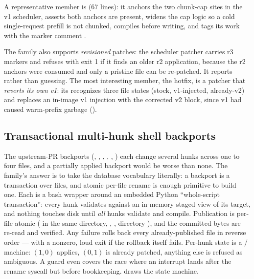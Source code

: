 A representative member is
 (67 lines): it
anchors the two chunk-cap sites in the v1 scheduler, asserts both anchors are
present, widens the cap logic so a cold single-request prefill is not chunked,
compiles before writing, and tags its work with the marker comment
.

The family also supports \emph{revisioned}
patches: the  scheduler patcher carries r3 markers and
refuses with exit 1 if it finds an older r2 application, because the r2
anchors were consumed and only a pristine file can be re-patched. It reports
 rather than guessing. The most interesting member,
the  hotfix, is a patcher that \emph{reverts its own v1}:
its  recognizes three file states (stock, v1-injected,
already-v2) and replaces an in-image v1 injection with the corrected v2
block, since v1 had caused warm-prefix garbage ().

\subsection{Transactional multi-hunk shell backports}

The upstream-PR backports (, , ,
, , ) each change several hunks
across one to four files, and a partially applied backport would be worse than
none. The family's answer is to take the database vocabulary literally: a
backport is a transaction over files, and atomic per-file rename is enough
primitive to build one. Each is a bash wrapper around an embedded Python ``whole-script
transaction'': every hunk validates against an in-memory staged view of its
target, and nothing touches disk until \emph{all} hunks validate and compile.
Publication is per-file atomic ( in the same directory,
, , directory ), and the committed
bytes are re-read and verified. Any failure rolls back every
already-published file in reverse order --- with a nonzero, loud exit if the
rollback itself fails. Per-hunk state is a
/ machine: $(1,0)$ applies, $(0,1)$ is
already patched, anything else is refused as ambiguous. A
 guard even covers the race where an interrupt lands
after the rename syscall but before bookkeeping. 
draws the state machine.

